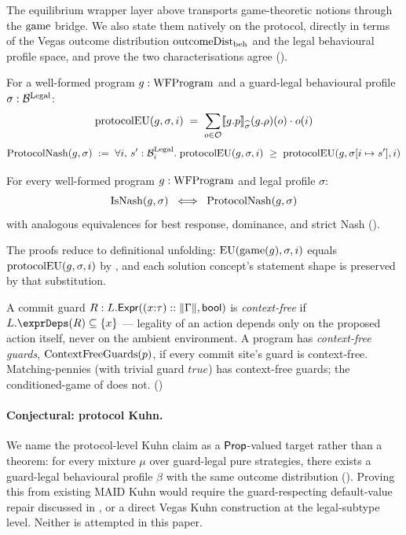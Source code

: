 \documentclass[11pt]{article}
\begin{document}
The equilibrium wrapper layer above transports game-theoretic notions
through the $\mathrm{game}$ bridge. We also state them natively on the
protocol, directly in terms of the Vegas outcome distribution
$\mathrm{outcomeDist}_{\mathrm{beh}}$ and the legal behavioural profile space,
and prove the two characterisations agree
().

\begin{definition}
For a well-formed program $g : \mathrm{WFProgram}$ and a guard-legal behavioural
profile $\sigma : \mathcal{B}^{\mathrm{Legal}}$:
\[
  \mathrm{protocolEU}(g, \sigma, i) \;=\;
    \sum_{o \in \mathcal{O}}
      \llbracket g.p \rrbracket_{\widehat{\sigma}}(g.\rho)(o)\cdot o(i)
\]
\[
  \mathrm{ProtocolNash}(g, \sigma) \;:=\;
    \forall i,\, s' : \mathcal{B}^{\mathrm{Legal}}_i.\;
      \mathrm{protocolEU}(g, \sigma, i) \;\geq\;
        \mathrm{protocolEU}(g, \sigma[i \mapsto s'], i)
\]
\end{definition}

\begin{theorem}\label{thm:protocol-correspondence}
For every well-formed program $g : \mathrm{WFProgram}$ and legal profile $\sigma$:
\[
  \mathrm{IsNash}(g, \sigma) \;\iff\; \mathrm{ProtocolNash}(g, \sigma)
\]
with analogous equivalences for best response, dominance, and strict
Nash ().
\end{theorem}

The proofs reduce to definitional unfolding: $\mathrm{EU}(\mathrm{game}(g), \sigma, i)$
equals $\mathrm{protocolEU}(g, \sigma, i)$ by , and each solution
concept's statement shape is preserved by that substitution.

\begin{definition}\label{def:contextfree}
A commit guard $R : L.\mathsf{Expr}((x{:}\tau) :: \|\Gamma\|, \mathsf{bool})$ is
\emph{context-free} if $L.\exprDeps(R) \subseteq \{x\}$ --- legality
of an action depends only on the proposed action itself, never on
the ambient environment. A program has \emph{context-free guards},
$\mathrm{ContextFreeGuards}(p)$, if every commit site's guard is context-free.
Matching-pennies (with trivial guard $\mathit{true}$) has context-free
guards; the conditioned-game of  does not.
()
\end{definition}

\paragraph{Conjectural: protocol Kuhn.}
We name the protocol-level Kuhn claim as a $\mathsf{Prop}$-valued target
rather than a theorem: for every mixture $\mu$ over guard-legal pure
strategies, there exists a guard-legal behavioural profile $\beta$
with the same outcome distribution
(). Proving this from existing MAID Kuhn
would require the guard-respecting default-value repair discussed in
, or a direct Vegas Kuhn construction at the
legal-subtype level. Neither is attempted in this paper.
\end{document}
